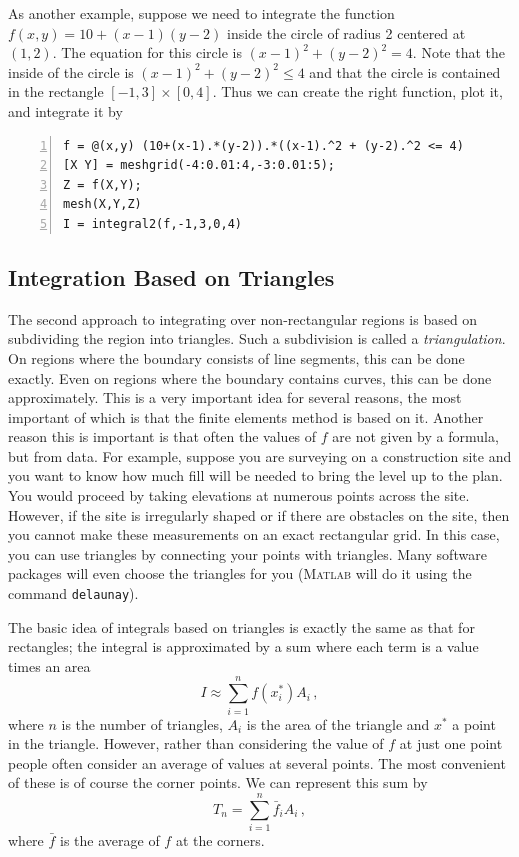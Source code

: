 As another example, suppose we need to integrate the function $f(x,y) = 10+(x-1)(y-2)$
inside the circle of radius 2 centered at $(1,2)$. The equation for
this circle is $(x-1)^2 + (y-2)^2 = 4$. Note that the inside of the
circle is $(x-1)^2 + (y-2)^2 \le 4$ and that the circle is contained
in the rectangle $[-1,3] \times [0,4]$. Thus  we can create
the right function, plot it, and integrate it by
\begin{lstlisting}[frame=none,numbers=left]
f = @(x,y) (10+(x-1).*(y-2)).*((x-1).^2 + (y-2).^2 <= 4)
[X Y] = meshgrid(-4:0.01:4,-3:0.01:5);
Z = f(X,Y);
mesh(X,Y,Z)
I = integral2(f,-1,3,0,4)
\end{lstlisting}


\subsection*{Integration Based on Triangles}

The second approach to integrating over non-rectangular regions
is based on subdividing the region into triangles. Such a subdivision
is called a {\em triangulation}. On regions
where the boundary consists of line segments, this can be done exactly.
Even on regions where the boundary contains curves, this can be done
approximately. This is a very important idea for several reasons, the
most important of which is that the finite elements method is based on it.
Another reason this is important is that often the values of
$f$ are not given by a formula, but from data.
For example, suppose you are surveying on a construction site
and you want to know how much fill will be needed to bring the
level up to the plan. You would proceed by taking elevations
at numerous points across the site. However, if the site is
irregularly shaped or if there are obstacles on the site, then
you cannot make these measurements on an exact rectangular grid.
In this case, you can use triangles by connecting your points
with triangles. Many software packages will even choose the
triangles for you (\textsc{Matlab} will do it using the command
\verb&delaunay&).

The basic idea of integrals based on triangles is exactly the same
as that for rectangles; the integral is approximated by a sum
where each term is a value times an area
$$
   I \approx \sum_{i=1}^n f(x^*_i) A_i
\,,
$$
where $n$ is the number of triangles, $A_i$ is the area of the triangle
and $x^*$ a point in the triangle. However, rather than considering
the value of $f$ at just one point people often consider an average
of values at several points. The most convenient of these is of course
the corner points. We can represent this sum by
$$
   T_n = \sum_{i=1}^n \bar{f}_i A_i
\,,
$$
where $\bar{f}$ is the average of $f$ at the corners.

